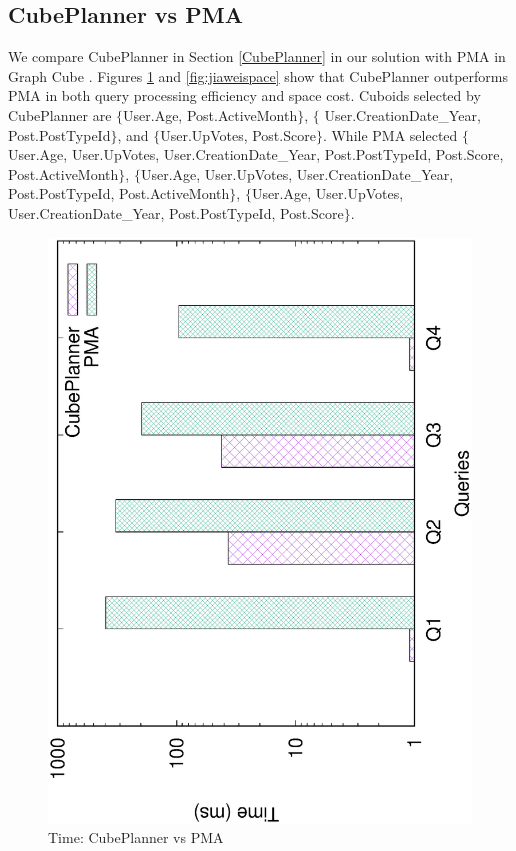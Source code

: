 	\subsection{CubePlanner vs PMA}
	\label{CubePlannerPMA}
	We compare CubePlanner in Section \ref{CubePlanner} in our solution with PMA in Graph Cube \cite{sigmod11_ZhaoLXH11}. Figures \ref{fig:qjiawei} and \ref{fig:jiaweispace} show that CubePlanner outperforms PMA in both query processing efficiency and space cost. Cuboids selected by CubePlanner are $\{$User.Age, Post.ActiveMonth$\}$, $\{$ User.CreationDate\_Year, Post.PostTypeId$\}$, and $\{$User.UpVotes, Post.Score$\}$. While PMA selected $\{$User.Age, User.UpVotes, User.CreationDate\_Year, Post.PostTypeId, Post.Score, Post.ActiveMonth$\}$, $\{$User.Age, User.UpVotes, User.CreationDate\_Year, Post.PostTypeId, Post.ActiveMonth$\}$, $\{$User.Age, User.UpVotes, User.CreationDate\_Year, Post.PostTypeId, Post.Score$\}$.


\begin{figure}[H]
	\centering
	\includegraphics[scale=0.43, angle=270]{plot/qjiawei.eps}
	\caption{Time: CubePlanner vs PMA}
	\label{fig:qjiawei}
\end{figure}

